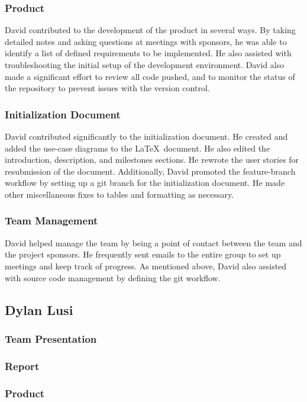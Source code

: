 \documentclass[12pt]{article}
\begin{document}
\begin{spacing}{1.5}
\subsubsection{Product}
David contributed to the development of the product in several ways. By taking detailed notes and asking questions at meetings with sponsors, he was able to identify a list of defined requirements to be implemented. He also assisted with troubleshooting the initial setup of the development environment. David also made a significant effort to review all code pushed, and to monitor the status of the repository to prevent issues with the version control.
\subsubsection{Initialization Document}
David contributed significantly to the initialization document. He created and added the use-case diagrams to the \LaTeX\ document. He also edited the introduction, description, and milestones sections. He rewrote the user stories for resubmission of the document. Additionally, David promoted the feature-branch workflow by setting up a git branch for the initialization document. He made other miscellaneous fixes to tables and formatting as necessary.
\subsubsection{Team Management}
David helped manage the team by being a point of contact between the team and the project sponsors. He frequently sent emails to the entire group to set up meetings and keep track of progress. As mentioned above, David also assisted with source code management by defining the git workflow.

\clearpage

\subsection{Dylan Lusi}
\subsubsection{Team Presentation}
\subsubsection{Report}
\subsubsection{Product}

\end{spacing}
\end{document}
